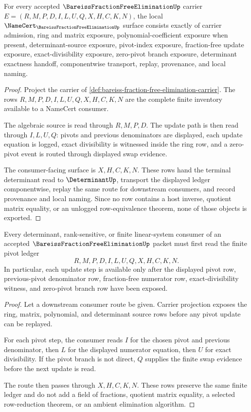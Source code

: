 \begin{theorem}
\label{thm:bareiss-fraction-free-elimination-namecert-obligations}
For every accepted $\BareissFractionFreeEliminationUp$ carrier $E=(R,M,P,D,I,L,U,Q,X,H,C,K,N)$, the local $\NameCert_{\BareissFractionFreeEliminationUp}$ surface consists exactly of carrier admission, ring and matrix exposure, polynomial-coefficient exposure when present, determinant-source exposure, pivot-index exposure, fraction-free update exposure, exact-divisibility exposure, zero-pivot branch exposure, determinant exactness handoff, componentwise transport, replay, provenance, and local naming.
\end{theorem}
\begin{proof}
Project the carrier of \autoref{def:bareiss-fraction-free-elimination-carrier}. The rows $R,M,P,D,I,L,U,Q,X,H,C,K,N$ are the complete finite inventory available to a NameCert consumer.

The algebraic source is read through $R,M,P,D$. The update path is then read through $I,L,U,Q$: pivots and previous denominators are displayed, each update equation is logged, exact divisibility is witnessed inside the ring row, and a zero-pivot event is routed through displayed swap evidence.

The consumer-facing surface is $X,H,C,K,N$. These rows hand the terminal determinant read to $\DeterminantUp$, transport the displayed ledger componentwise, replay the same route for downstream consumers, and record provenance and local naming. Since no row contains a host inverse, quotient matrix equality, or an unlogged row-equivalence theorem, none of those objects is exported.
\end{proof}

\begin{theorem}
\label{thm:bareiss-fraction-free-elimination-pivot-ledger}
Every determinant, rank-sensitive, or finite linear-system consumer of an accepted $\BareissFractionFreeEliminationUp$ packet must first read the finite pivot ledger
$$
R,M,P,D,I,L,U,Q,X,H,C,K,N.
$$
In particular, each update step is available only after the displayed pivot row, previous-pivot denominator row, fraction-free numerator row, exact-divisibility witness, and zero-pivot branch row have been exposed.
\end{theorem}
\begin{proof}
Let a downstream consumer route be given. Carrier projection exposes the ring, matrix, polynomial, and determinant source rows before any pivot update can be replayed.

For each pivot step, the consumer reads $I$ for the chosen pivot and previous denominator, then $L$ for the displayed numerator equation, then $U$ for exact divisibility. If the pivot branch is not direct, $Q$ supplies the finite swap evidence before the next update is read.

The route then passes through $X,H,C,K,N$. These rows preserve the same finite ledger and do not add a field of fractions, quotient matrix equality, a selected row-reduction theorem, or an ambient elimination algorithm.
\end{proof}

